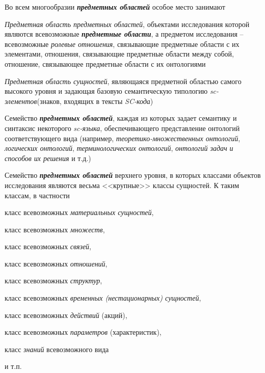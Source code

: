\begin{SCn}
{Во всем многообразии \textbf{\textit{предметных областей}} особое место занимают
\begin{scnenumerate}
    \item \textit{Предметная область предметных областей}, объектами исследования которой являются всевозможные \textbf{\textit{предметные области}}, а предметом исследования – всевозможные \textit{ролевые отношения}, связывающие предметные области с их элементами, отношения, связывающие предметные области между собой, отношение, связывающее предметные области с их онтологиями
    \item \textit{Предметная область сущностей}, являющаяся предметной областью самого высокого уровня и задающая базовую семантическую типологию \textit{sc-элементов}(знаков, входящих в тексты \textit{SC-кода})
    \item Семейство \textbf{\textit{предметных областей}}, каждая из которых задает семантику и синтаксис некоторого \textit{sc-языка}, обеспечивающего представление онтологий соответствующего вида (например, \textit{теоретико-множественных онтологий}, \textit{логических онтологий}, \textit{терминологических онтологий}, \textit{онтологий задач и способов их решения} и т.д.)
    \item Семейство \textbf{\textit{предметных областей}} верхнего уровня, в которых классами объектов исследования являются весьма <<крупные>> классы сущностей. К таким классам, в частности
    
    \begin{scnitemizeii}
        \item класс всевозможных \textit{материальных сущностей},
        \item класс всевозможных \textit{множеств},
        \item класс всевозможных \textit{связей},
        \item класс всевозможных \textit{отношений},
        \item класс всевозможных \textit{структур},
        \item класс всевозможных \textit{временных (нестационарных) сущностей},
        \item класс всевозможных \textit{действий} (акций),
        \item класс всевозможных \textit{параметров} (характеристик),
        \item класс \textit{знаний} всевозможного вида 
        \item и т.п.
    \end{scnitemizeii}
\end{scnenumerate}


}
\end{SCn}
